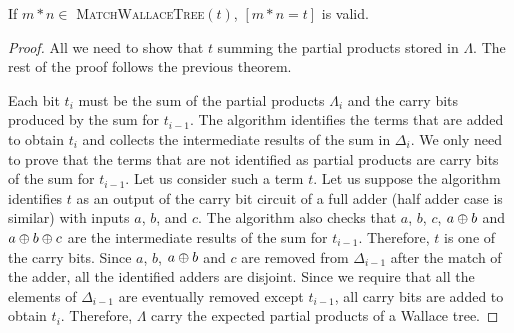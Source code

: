 \begin{thm}
  If $m*n\in$ \textsc{MatchWallaceTree}$(t)$, $[m*n = t]$ is valid.
\end{thm}
\begin{proof}
  All we need to show that $t$ summing the partial products stored in
  $\Lambda$.
  The rest of the proof follows the previous theorem.

  Each bit $t_i$ must be the sum of the partial products $\Lambda_i$ and 
  the carry bits produced by the sum for $t_{i-1}$.
  The algorithm identifies the terms that are added to obtain $t_i$
  and collects the intermediate results of the sum in $\Delta_{i}$.
  We only need to prove that the terms that are not identified as
  partial products are carry bits of the sum for $t_{i-1}$.
  Let us consider such a term $t$.
  Let us suppose the algorithm identifies $t$ as an output of the carry
  bit circuit of a full adder (half adder case is similar) with inputs
  $a$, $b$, and $c$.
  The algorithm also checks that $a$, $b$, $c$, $a \oplus b$ and
  $a \oplus b \oplus c$ are the intermediate
  results of the sum for $t_{i-1}$.
  Therefore, $t$ is one of the carry bits.
  Since $a$, $b$, $a \oplus b$ and $c$ are removed from $\Delta_{i-1}$
  after the match of the adder,
  all the identified adders are disjoint.
  Since we require that all the elements of $\Delta_{i-1}$  are eventually
  removed except $t_{i-1}$, all carry bits are added to obtain $t_i$.
  Therefore, $\Lambda$ carry the expected partial products of a Wallace tree.
\end{proof}


